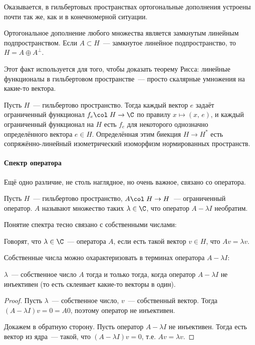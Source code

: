 \documentclass{trlnotes}
\begin{document}
    Оказывается, в гильбертовых пространствах ортогональные дополнения устроены почти так же, как и в конечномерной ситуации.

    \begin{st}\label{st:hilb-orth-compl}
        Ортогональное дополнение любого множества является замкнутым линейным подпространством. Если $A \subset H$~--- замкнутое линейное подпространство, то $H = A \oplus A^{\perp}$.
    \end{st}

    Этот факт используется для того, чтобы доказать теорему Рисса: линейные функционалы в гильбертовом пространстве~--- просто скалярные умножения на какие-то вектора.

    \begin{thm}[Рисс]\label{thm:rietz-repr}
        Пусть $H$~--- гильбертово пространство. Тогда каждый вектор $e$ задаёт ограниченный функционал $f_e \col \; H \to \C$ по правилу $x \mapsto (x, \, e)$, и каждый ограниченный функционал на $H$ есть $f_e$ для некоторого однозначно определённого вектора $e \in H$. Определённая этим биекция $H \to H^{*}$ есть сопряжённо-линейный изометрический изоморфизм нормированных пространств.
    \end{thm}

    \paragraph{Спектр оператора}

    Ещё одно различие, не столь наглядное, но очень важное, связано со  оператора.

    \begin{de}
        Пусть $H$~--- гильбертово пространство, $A\col \; H \to H$~--- ограниченный оператор.  $A$ называют множество таких $\lambda \in \C$, что оператор $A - \lambda I$ необратим.
    \end{de}
    Понятие спектра тесно связано с собственными числами:
    \begin{de}
        Говорят, что $\lambda \in \C$~---  оператора $A$, если есть такой вектор $v \in H$, что $Av = \lambda v$.
    \end{de}
    Собственные числа можно охарактеризовать в терминах оператора $A - \lambda I$:
    \begin{st}
        $\lambda$~--- собственное число $A$ тогда и только тогда, когда оператор $A - \lambda I$ не инъективен (то есть склеивает какие-то векторы в один).
        \begin{proof}
            Пусть $\lambda$~--- собственное число, $v$~--- собственный вектор. Тогда $(A - \lambda I)v = 0 = A0$, поэтому оператор не инъективен.

            Докажем в обратную сторону. Пусть оператор $A - \lambda I$ не инъективен. Тогда есть вектор из ядра~--- такой, что $(A - 
            \lambda I)v = 0$, т.е. $Av = \lambda v$.
        \end{proof}
    \end{st}
\end{document}
